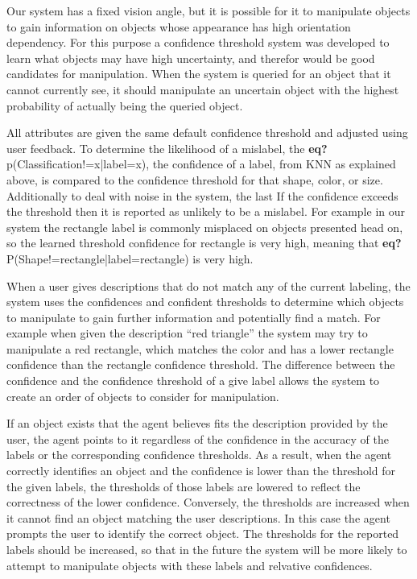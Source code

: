 \documentclass[11pt]{article}
\newcommand{\xxx}[1]{{\bf \color{red} #1}}
\begin{document}
Our system has a fixed vision angle, but it is possible for it to
manipulate objects to gain information on objects whose appearance has high
orientation dependency. For this purpose a confidence threshold system was
developed to learn what objects may have high uncertainty, and therefor would
be good candidates for manipulation. When the system is queried for an object
that it cannot currently see, it should manipulate an uncertain object with the
highest probability of actually being the queried object.

All attributes are given the same default confidence threshold and adjusted
using user feedback. To determine the likelihood of a mislabel, the \xxx{eq?}p(Classification!=x|label=x), the confidence
of a label, from KNN as explained above, is compared to the
confidence threshold for that shape, color, or size.  Additionally to deal with noise in the system, the last If the confidence exceeds
the threshold then it is reported as unlikely to be a mislabel.  For example in
our system the rectangle label is commonly misplaced on objects presented head
on, so the learned threshold confidence for rectangle is very high, meaning that \xxx{eq?}P(Shape!=rectangle|label=rectangle) is very high.

When a user gives descriptions that do not match any of the current labeling,
the system uses the confidences and confident thresholds to determine which
objects to manipulate to gain further information and potentially find a match.  For example when given the description ``red triangle'' the system may try to
manipulate a red rectangle, which matches the color and has a lower rectangle
confidence than the rectangle confidence threshold.  The difference between the confidence and the confidence threshold of a give label allows the system to
create an order of objects to consider for manipulation.

If an object exists that the agent believes fits the description provided by the
user, the agent points to it regardless of the confidence in the accuracy of the labels or the corresponding confidence thresholds. As a result, when the
agent correctly identifies an object and the confidence is lower than the
threshold for the given labels, the thresholds of those labels are lowered to
reflect the correctness of the lower confidence. Conversely, the thresholds are increased
when it cannot find an object matching the user descriptions.  In this case the agent prompts the user to identify the correct object. The thresholds for the reported labels should be increased, so that in the future the system will be more likely to attempt to manipulate objects with these labels and relvative confidences.
\end{document}
